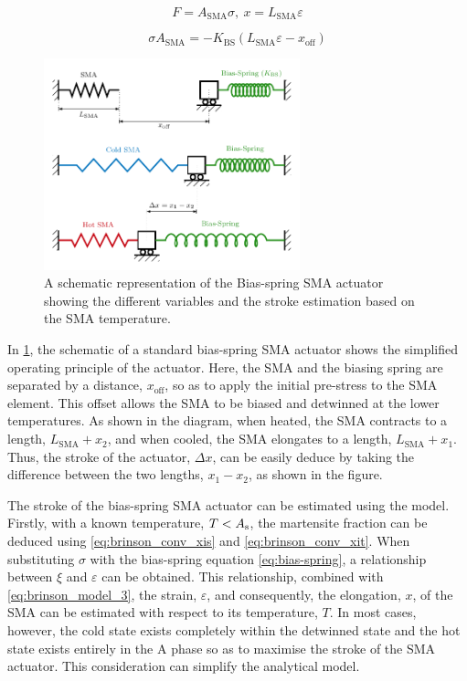 \begin{equation}
    \label{eq:f-x-sma}
    F = A_\mathrm{SMA}\sigma,~x = L_\mathrm{SMA}\varepsilon
\end{equation}

\begin{equation}
    \label{eq:bias-spring}
    \sigma A_\mathrm{SMA} = -K_\mathrm{BS}\left(L_\mathrm{SMA}\varepsilon-x_\mathrm{off}\right)
\end{equation}
\begin{figure}[hbt]
    \centering
    \includegraphics[width=0.66\textwidth]{images/chap2/bias-spring-diagram.pdf}
    \caption{A schematic representation of the Bias-spring SMA actuator showing the different variables and the stroke estimation based on the SMA temperature.}
    \label{fig:bias-spring-diagram}
\end{figure}

In \cref{fig:bias-spring-diagram}, the schematic of a standard bias-spring SMA actuator shows the simplified operating principle of the actuator. Here, the SMA and the biasing spring are separated by a distance, $x_\mathrm{off}$, so as to apply the initial pre-stress to the SMA element. This offset allows the SMA to be biased and detwinned at the lower temperatures. As shown in the diagram, when heated, the SMA contracts to a length, $L_\mathrm{SMA}+x_2$, and when cooled, the SMA elongates to a length, $L_\mathrm{SMA}+x_1$. Thus, the stroke of the actuator, $\Delta x$, can be easily deduce by taking the difference between the two lengths, $x_1-x_2$, as shown in the figure.

The stroke of the bias-spring SMA actuator can be estimated using the \cite{brinsonOneDimensionalConstitutiveBehavior1993} model. Firstly, with a known temperature, $T < A_\mathrm{s}$, the martensite fraction can be deduced using \cref{eq:brinson_conv_xis} and \cref{eq:brinson_conv_xit}. When substituting $\sigma$ with the bias-spring equation \ref{eq:bias-spring}, a relationship between $\xi$ and $\varepsilon$ can be obtained. This relationship, combined with \cref{eq:brinson_model_3}, the strain, $\varepsilon$, and consequently, the elongation, $x$, of the SMA can be estimated with respect to its temperature, $T$. In most cases, however, the cold state exists completely within the detwinned state and the hot state exists entirely in the A phase so as to maximise the stroke of the SMA actuator. This consideration can simplify the analytical model.

